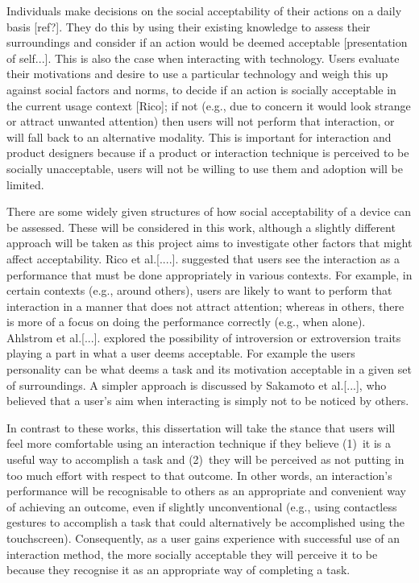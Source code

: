 \documentclass{l4proj}
\begin{document}
Individuals make decisions on the social acceptability of their actions on a daily basis [ref?]. They do this by using their existing knowledge to assess their surroundings and consider if an action would be deemed acceptable [presentation of self...]. This is also the case when interacting with technology. Users evaluate their motivations and desire to use a particular technology and weigh this up against social factors and norms, to decide if an action is socially acceptable in the current usage context [Rico]; if not (e.g., due to concern it would look strange or attract unwanted attention) then users will not perform that interaction, or will fall back to an alternative modality. This is important for interaction and product designers because if a product or interaction technique is perceived to be socially unacceptable, users will not be willing to use them and adoption will be limited.

There are some widely given structures of how social acceptability of a device can be assessed. These will be considered in this work, although a slightly different approach will be taken as this project aims to investigate other factors that might affect acceptability. Rico et al.[....]. suggested that users see the interaction as a performance that must be done appropriately in various contexts. For example, in certain contexts (e.g., around others), users are likely to want to perform that interaction in a manner that does not attract attention; whereas in others, there is more of a focus on doing the performance correctly (e.g., when alone). Ahlstrom et al.[...]. explored the possibility of introversion or extroversion traits playing a part in what a user deems acceptable. For example the users personality can be what deems a task and its motivation acceptable in a given set of surroundings. A simpler approach is discussed by Sakamoto et al.[...], who believed that a user's aim when interacting is simply not to be noticed by others.

In contrast to these works, this dissertation will take the stance that users will feel more comfortable using an interaction technique if they believe (1)~it is a useful way to accomplish a task and (2)~they will be perceived as not putting in too much effort with respect to that outcome. In other words, an interaction's performance will be recognisable to others as an appropriate and convenient way of achieving an outcome, even if slightly unconventional (e.g., using contactless gestures to accomplish a task that could alternatively be accomplished using the touchscreen). Consequently, as a user gains experience with successful use of an interaction method, the more socially acceptable they will perceive it to be because they recognise it as an appropriate way of completing a task.
\end{document}
